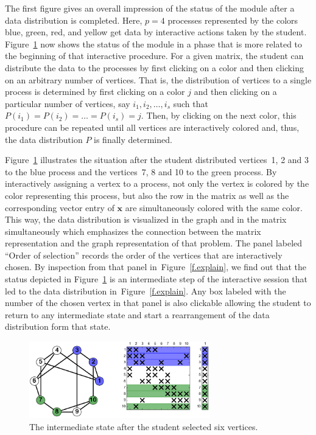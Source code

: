 \documentclass[12pt, twoside]{book}
\newcommand{\vek}[1]{{\ensuremath{\mathbf #1}}}
\newcommand{\figref}[1]{Figure~\protect\ref{#1}}
\begin{document}
The first figure gives an overall impression of the status of the module after a data
distribution is completed. Here, $p=4$ processes represented by the colors blue, green,
red, and yellow get data by interactive actions taken by the student.
Figure~\ref{f.beginning} now shows the status of the module in a phase that is more
related to the beginning of that interactive procedure. For a given matrix, the student
can distribute the data to the processes by first clicking on a color and then clicking
on an arbitrary number of vertices. That is, the distribution of vertices to a single
process is determined by first clicking on a color $j$ and then clicking on a particular
number of vertices, say $i_1, i_2, \dots, i_s$ such that $P(i_1) = P(i_2) = \dots =
P(i_s) = j$. Then, by clicking on the next color, this procedure can be repeated until
all vertices are interactively colored and, thus, the data distribution $P$ is finally
determined.

Figure~\ref{f.beginning} illustrates the situation after the student distributed
vertices~1, 2 and 3 to the blue process and the vertices~7, 8 and 10 to the green
process. By interactively assigning a vertex to a process, not only the vertex is colored
by the color representing this process, but also the row in the matrix as well as the
corresponding vector entry of \vek{x} are simultaneously colored with the same color.
This way, the data distribution is visualized in the graph and in the matrix
simultaneously which emphasizes the connection between the matrix representation and the
graph representation of that problem. The panel labeled ``Order of selection'' records
the order of the vertices that are interactively chosen. By inspection from that panel
in~\figref{f.explain}, we find out that the status depicted in \figref{f.beginning} is an
intermediate step of the interactive session that led to the data distribution
in~\figref{f.explain}. Any box labeled with the number of the chosen vertex in that panel
is also clickable allowing the student to return to any intermediate state and start a
rearrangement of the data distribution form that state.


\begin{figure}
\centering
\includegraphics[width=0.7\textwidth]{twoColors}
\caption{The intermediate state after the student selected six vertices.}
\label{f.beginning}
\end{figure}
\end{document}
